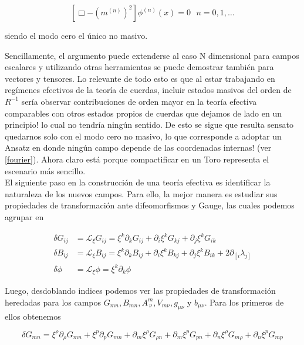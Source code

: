 \documentclass{article}
\numberwithin{equation}{section}
\begin{document}
\begin{equation}
\left[\Box - (m^{(n)})^2 \right] \phi^{(n)}(x) = 0 \ \ \ n=0,1,\dots
\end{equation} 

siendo el modo cero el único no masivo.

Sencillamente, el argumento puede extenderse al caso N dimensional para campos escalares y utilizando otras herramientas se puede demostrar también para vectores y tensores. Lo relevante de todo esto es que al estar trabajando en regímenes efectivos de la teoría de cuerdas, incluir estados masivos del orden de $ R^{-1} $ sería observar contribuciones de orden mayor en la teoría efectiva comparables con otros estados propios de cuerdas que dejamos de lado en un principio! lo cual no tendría ningún sentido. De esto se sigue que resulta sensato quedarnos solo con el modo cero no masivo, lo que corresponde a adoptar un Ansatz en donde ningún campo depende de las coordenadas internas! (ver \ref{fourier}). Ahora claro está porque compactificar en un Toro representa el escenario más sencillo.\\


El siguiente paso en la construcción de una teoría efectiva es identificar la naturaleza de los nuevos campos. Para ello, la mejor manera es estudiar sus propiedades de transformación ante difeomorfismos y Gauge, las cuales podemos agrupar en

\begin{subequations}
	\begin{align}
	\label{deltag}
	\delta G_{i j} &= \mathcal{L}_{\xi}G_{i j} = \xi^{k} \partial_k G_{i j} + \partial_i \xi^k G_{k j} + \partial_j \xi^k G_{i k}\\ 
	\label{deltab}
	\delta B_{i j} &= \mathcal{L}_{\xi}B_{i j} = \xi^{k} \partial_k B_{i j} + \partial_i \xi^k B_{k j} + \partial_j \xi^k B_{i k} + 2 \partial_{\left[ i \right.} \lambda_{\left. j \right]}\\
	\label{deltafi} 
	\delta \phi &= \mathcal{L}_{\xi} \phi = \xi^{k} \partial_k \phi
	\end{align}
\end{subequations} 

Luego, desdoblando indices podemos ver las propiedades de transformación heredadas para los campos $ G_{m n}, B_{m n}, A^m_{\ \nu}, V_{m \nu}, g_{\mu \nu} $ y $ b_{\mu \nu} $. Para los primeros de ellos obtenemos


\begin{equation*}
\delta G_{m n} = \xi^{\rho} \partial_{\rho} G_{m n} + \xi^p \partial_p G_{m n} + \partial_m \xi^{\rho} G_{\rho n} + \partial_m \xi^p G_{p n} + \partial_n \xi^{\rho} G_{m \rho} + \partial_n \xi^p G_{m p}
\end{equation*}
\end{document}
